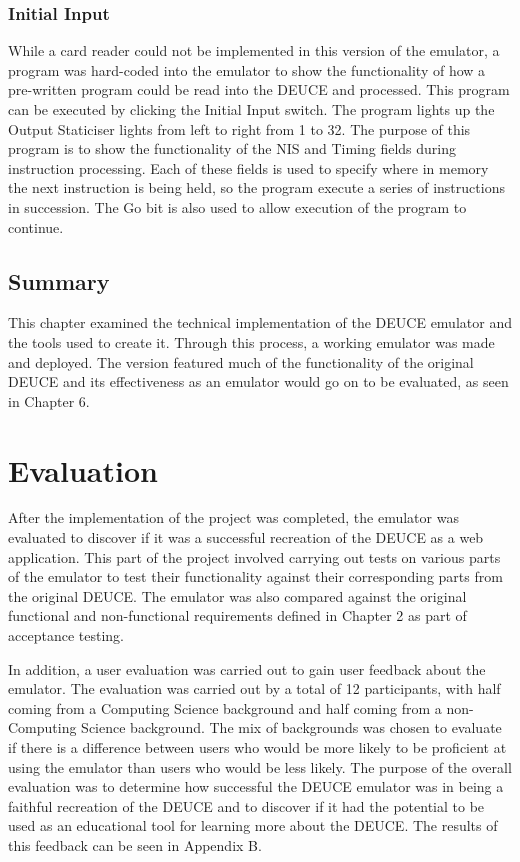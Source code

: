 \documentclass{l4proj}
\begin{document}
\subsection{Initial Input}
While a card reader could not be implemented in this version of the emulator, a program was hard-coded into the emulator to show the functionality of how a pre-written program could be read into the DEUCE and processed. This program can be executed by clicking the Initial Input switch. The program lights up the Output Staticiser lights from left to right from 1 to 32. The purpose of this program is to show the functionality of the NIS and Timing fields during instruction processing. Each of these fields is used to specify where in memory the next instruction is being held, so the program execute a series of instructions in succession. The Go bit is also used to allow execution of the program to continue.

\section{Summary}
This chapter examined the technical implementation of the DEUCE emulator and the tools used to create it. Through this process, a working emulator was made and deployed. The version featured much of the functionality of the original DEUCE and its effectiveness as an emulator would go on to be evaluated, as seen in Chapter 6.

\chapter{Evaluation} 
After the implementation of the project was completed, the emulator was evaluated to discover if it was a successful recreation of the DEUCE as a web application. This part of the project involved carrying out tests on various parts of the emulator to test their functionality against their corresponding parts from the original DEUCE. The emulator was also compared against the original functional and non-functional requirements defined in Chapter 2 as part of acceptance testing.

In addition, a user evaluation was carried out to gain user feedback about the emulator. The evaluation was carried out by a total of 12 participants, with half coming from a Computing Science background and half coming from a non-Computing Science background. The mix of backgrounds was chosen to evaluate if there is a difference between users who would be more likely to be proficient at using the emulator than users who would be less likely. The purpose of the overall evaluation was to determine how successful the DEUCE emulator was in being a faithful recreation of the DEUCE and to discover if it had the potential to be used as an educational tool for learning more about the DEUCE. The results of this feedback can be seen in Appendix B.
\end{document}
